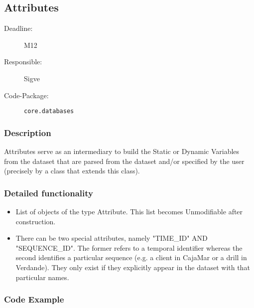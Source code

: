 \newpage
\subsection{Attributes}
\label{Functionality:ID}

\begin{description}
\item[Deadline:] M12
\item[Responsible:] Sigve
\item[Code-Package:] \texttt{core.databases}
\end{description}

\subsubsection*{Description}

Attributes serve as an intermediary to build the Static or Dynamic Variables from the dataset that are parsed from the dataset and/or specified by the user (precisely by a class that extends this class). 

\subsubsection*{Detailed functionality}

\begin{itemize}
\item List of objects of the type Attribute. This list becomes Unmodifiable after construction.
\item There can be two special attributes, namely "TIME\_ID" AND "SEQUENCE\_ID". The former refers to a temporal identifier whereas the second identifies a particular sequence (e.g. a client in CajaMar or a drill in Verdande). They only exist if they explicitly appear in the dataset with that particular names.
\end{itemize}

\subsubsection*{Code Example}
